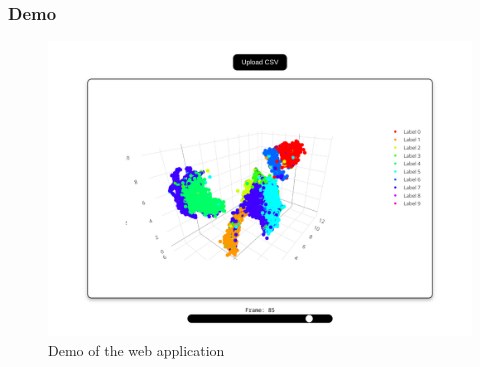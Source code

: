 \documentclass[aspectratio=169]{beamer}
\begin{document}
\begin{frame}
	\frametitle{Demo}

	\begin{figure}
		\includegraphics[scale=.23]{fig/demo.png}
		\caption{Demo of the web application}
	\end{figure}

\end{frame}
\end{document}
